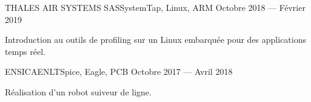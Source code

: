 \documentclass{faresume}
\begin{document}
\begin{column}[\leftcolumnwidth]
			{THALES AIR SYSTEMS SAS}{SystemTap, Linux, ARM}
			{Octobre 2018 --- Février 2019}
			{%
				\begin{additems}
					\item Introduction au outils de profiling sur un Linux embarquée pour des applications temps réel.
				\end{additems}
			}

			{ENSICAEN}{LTSpice, Eagle, PCB}
			{Octobre 2017 --- Avril 2018}
			{%
				\begin{additems}
					\item Réalisation d'un robot suiveur de ligne.
				\end{additems}
			}

\end{column}
\end{document}
